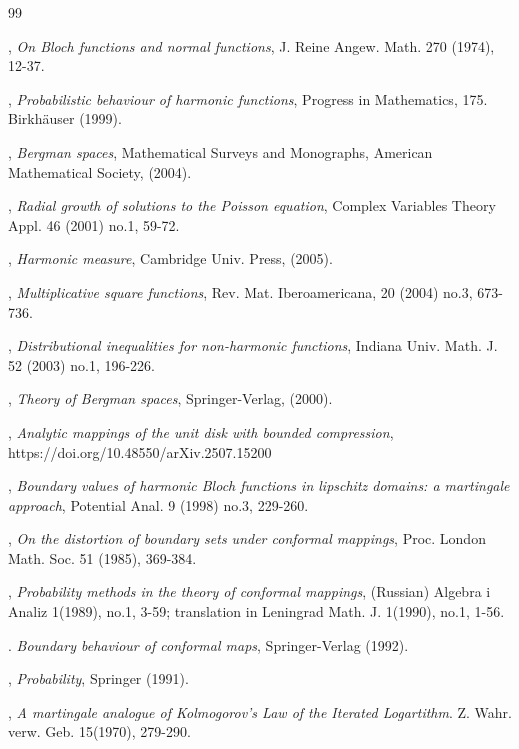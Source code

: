 \documentclass[11pt,letterpaper]{amsart}
\theoremstyle{definition}
\numberwithin{equation}{section}
\begin{document}
\begin{thebibliography}{99}

,
\newblock \emph{On Bloch functions and normal functions},
\newblock J. Reine Angew. Math. 270 (1974), 12-37.  


,
\newblock \emph{Probabilistic behaviour of harmonic functions},
\newblock Progress in Mathematics, 175. Birkh\"auser (1999). 

,
\newblock \emph{Bergman spaces},
\newblock Mathematical Surveys and Monographs, American Mathematical Society, (2004). 


,
\newblock \emph{Radial growth of solutions to the Poisson equation},
\newblock Complex Variables Theory Appl.  46 (2001) no.1, 59-72. 

,
\newblock \emph{Harmonic measure},
\newblock Cambridge Univ. Press, (2005). 


,
\newblock \emph{Multiplicative square functions},
\newblock Rev. Mat. Iberoamericana, 20 (2004) no.3, 673-736. 

,
\newblock \emph{Distributional inequalities for non-harmonic functions},
\newblock Indiana Univ. Math. J. 52 (2003) no.1, 196-226. 

,
\newblock \emph{Theory of Bergman spaces},
\newblock Springer-Verlag, (2000). 


,
\newblock \emph{Analytic mappings of the unit disk with bounded compression},
\newblock  https://doi.org/10.48550/arXiv.2507.15200

,
\newblock \emph{Boundary values of harmonic Bloch functions in lipschitz domains: a martingale approach},
\newblock Potential Anal. 9 (1998) no.3, 229-260. 

,
\newblock \emph{On the distortion of boundary sets under conformal mappings},
\newblock Proc. London Math. Soc. 51 (1985), 369-384.

,
\newblock \emph{Probability methods in the theory of conformal mappings},
\newblock (Russian) Algebra i Analiz 1(1989), no.1, 3-59; translation in Leningrad Math. J. 1(1990), no.1, 1-56.  


.
\newblock \emph{Boundary behaviour of conformal maps},
\newblock Springer-Verlag (1992). 


,
\newblock \emph{Probability},
\newblock Springer (1991).


,
\newblock \emph{A martingale analogue of Kolmogorov's Law of the Iterated Logartithm}.
\newblock Z. Wahr. verw. Geb. 15(1970), 279-290.  

\end{thebibliography}
\end{document}
